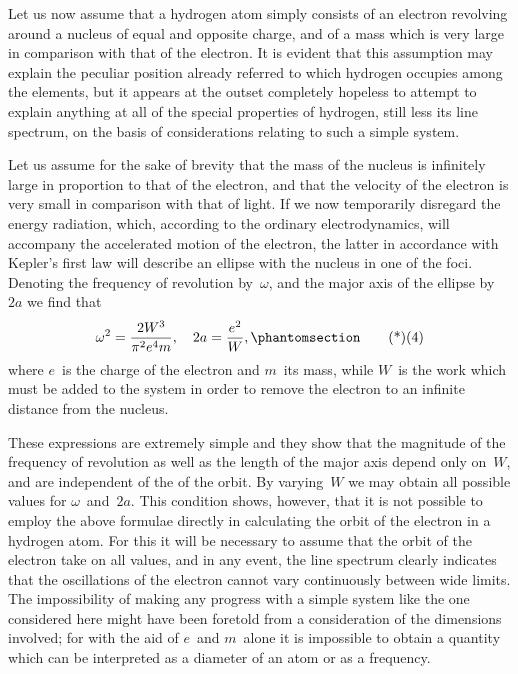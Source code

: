 Let us now assume that a hydrogen atom simply consists of an
electron revolving around a nucleus of equal and opposite charge,
and of a mass which is very large in comparison with that of the
electron. It is evident that this assumption may explain the peculiar
position already referred to which hydrogen occupies among the
elements, but it appears at the outset completely hopeless to attempt
to explain anything at all of the special properties of hydrogen,
still less its line spectrum, on the basis of considerations relating
to such a simple system.

Let us assume for the sake of brevity that the mass of the nucleus
is infinitely large in proportion to that of the electron, and that the
velocity of the electron is very small in comparison with that of
light. If we now temporarily disregard the energy radiation, which,
according to the ordinary electrodynamics, will accompany the accelerated
motion of the electron, the latter in accordance with
Kepler's first law will describe an ellipse with the nucleus in one
of the foci. Denoting the frequency of revolution by~$\omega$, and the
major axis of the ellipse by~$2a$ we find that
\[
\omega^{2} = \frac{2W^{3}}{\pi^{2} e^{4} m},\quad
2a = \frac{e^{2}}{W},
\Tag{(4)}
\]
where $e$~is the charge of the electron and $m$~its mass, while $W$~is
the work which must be added to the system in order to remove
the electron to an infinite distance from the nucleus.

These expressions are extremely simple and they show that the
magnitude of the frequency of revolution as well as the length of
the major axis depend only on~$W$, and are independent of the
 of the orbit. By varying~$W$ we may obtain all possible
values for $\omega$~and~$2a$. This condition shows, however, that it is not
possible to employ the above formulae directly in calculating the
orbit of the electron in a hydrogen atom. For this it will be necessary
to assume that the orbit of the electron  take on all values,
and in any event, the line spectrum clearly indicates that the
oscillations of the electron cannot vary continuously between wide
limits. The impossibility of making any progress with a simple
system like the one considered here might have been foretold from
a consideration of the dimensions involved; for with the aid of $e$~and
$m$~alone it is impossible to obtain a quantity which can be
interpreted as a diameter of an atom or as a frequency.

